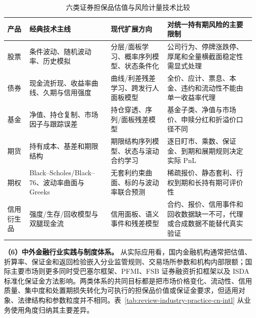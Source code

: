 \begin{table}[htbp]
  \centering
  \caption{六类证券担保品估值与风险计量技术比较}
  \label{tab:review-product-methods}
  \ReportTableText
  \begin{tabularx}{\textwidth}{@{}p{4.8em}p{9.5em}p{12.5em}X@{}}
    \toprule
    产品 & 经典技术主线 & 现代扩展方向 & 对统一持有期风险的主要限制 \\
    \midrule
    股票 & 条件波动、随机波动率、历史模拟 & 分层/面板学习、概率序列模型、状态条件化 & 公司行为、停牌涨跌停、厚尾和全量横截面稳定性需显式处理 \\
    债券 & 现金流折现、收益率曲线、久期与信用强度 & 曲线/利差残差学习、跨发行人面板模型 & 全价、应计、票息、本金、违约和流动性不能由单一收益率代理 \\
    基金 & 净值、持仓复制、市场因子与跟踪误差 & 持仓穿透、序列/面板残差模型 & 基金子类、净值与市场价、申赎分红和折溢价口径不同 \\
    期货 & 持有成本、基差和期限结构 & 期限结构序列模型、状态与滚动合约学习 & 逐日盯市、乘数、保证金、到期和展期规则决定实际 PnL \\
    期权 & Black--Scholes/Black--76、波动率曲面与 Greeks & 无套利约束曲面、标的与波动率联合预测 & 稀疏报价、静态套利、行权到期和长持有期可评价性 \\
    信用衍生品 & 强度/生存/回收模型与双腿现金流 & 信用面板、语义事件和残差模型 & 合约、报价、信用事件和回收数据缺一不可，代理或合成数据不能替代真实验证 \\
    \bottomrule
  \end{tabularx}
\end{table}

\textbf{（6）中外金融行业实践与制度体系。}
从实际应用看，国内金融机构通常把估值、折算率、保证金和返回检验嵌入分业监管规则、交易场所参数和机构内部限额；国际主要市场则更多同时受巴塞尔框架、PFMI、FSB 证券融资折扣框架以及 ISDA 标准化保证金方法影响。两类体系的共同目标都是把市场价格变化、流动性、信用质量、集中度和处置期损失转化为可执行的担保品价值或保证金要求，但适用对象、法律结构和参数粒度并不相同。表~\ref{tab:review-industry-practice-cn-intl} 从业务使用角度归纳其主要差异。

